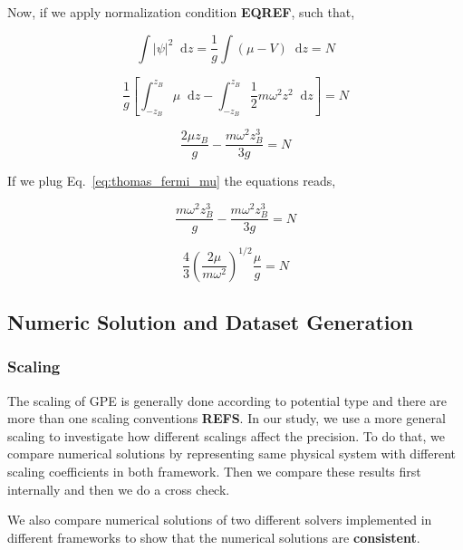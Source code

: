 \documentclass[a4paper,times,12pt]{article}
\newcommand*\dif{\mathop{}\!\mathrm{d}}
\begin{document}
Now, if we apply normalization condition \textbf{EQREF}, such that,


\begin{equation}
\label{eq:thomas_fermi_mu}
    \int |\psi|^2 \dif z = \frac{1}{g} \int (\mu - V) \dif z = N 
\end{equation}

\begin{equation}
   \frac{1}{g} \left [ \int_{-z_B}^{z_B} \mu \dif z - \int_{-z_B}^{z_B} \frac{1}{2}m\omega^2z^2 \dif z \right ] = N
\end{equation}


\begin{equation}
    \frac{2\mu z_B}{g} - \frac{m\omega^2 z_B^3}{3g} = N
\end{equation}

If we plug Eq.~\eqref{eq:thomas_fermi_mu} the equations reads,

\begin{equation}
    \frac{m\omega^2 z_B^3}{g} - \frac{m\omega^2 z_B^3}{3g} = N
\end{equation}



\begin{equation}
    \frac{4}{3} \left( \frac{2\mu}{m\omega^2} \right)^{1/2} \frac{\mu}{g} = N
\end{equation}


\subsection{Numeric Solution and Dataset Generation}

\subsubsection{Scaling}

The scaling of GPE is generally done according to potential type and there are more than one scaling conventions \textbf{REFS}. In our study, we use a more general scaling to investigate how different scalings affect the precision. To do that, we compare numerical solutions by representing same physical system with different scaling coefficients in both framework. Then we compare these results first internally and then we do a cross check. 

We also compare numerical solutions of two different solvers implemented in different frameworks to show that the numerical solutions are \textbf{consistent}.\\ 
\end{document}
